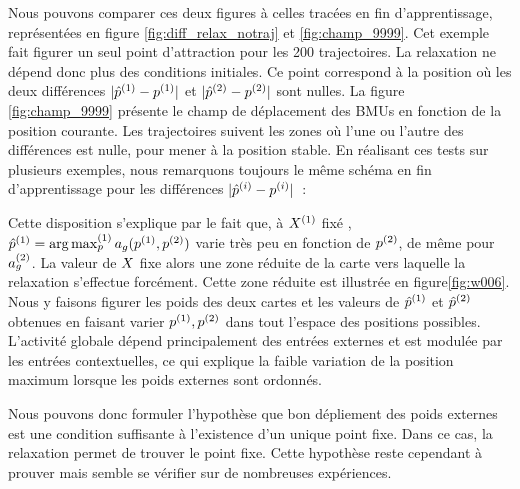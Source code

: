 \documentclass[../main]{subfiles}
\begin{document}
Nous pouvons comparer ces deux figures à celles tracées en fin d'apprentissage, représentées en figure \ref{fig:diff_relax_notraj} et \ref{fig:champ_9999}.
Cet exemple fait figurer un seul point d'attraction pour les 200 trajectoires. La relaxation ne dépend donc plus des conditions initiales.
Ce point correspond à la position où les deux différences $\lvert \hat{p}^{({1})} - p^{({1})} \rvert$ et $\lvert \hat{p}^{({2})} - p^{({2})}\rvert$ sont nulles.
La figure \ref{fig:champ_9999} présente le champ de déplacement des BMUs en fonction de la position courante. Les trajectoires suivent les zones où l'une ou l'autre des différences est nulle, pour mener à la position stable. 
En réalisant ces tests sur plusieurs exemples, nous remarquons toujours le même schéma en fin d'apprentissage pour les différences $\lvert \hat{p}^{({i})} - p^{({i})} \rvert$~:

Cette disposition s'explique par le fait que, à $X^{({1})}$ fixé ,$\hat{p}^{({1})} = \operatorname*{arg\,max}_p^{({1})} a_g(p^{({1})}, p^{({2})})$ varie très peu en fonction de $p^{({2})}$, de même pour $a_g^{({2})}$.
La valeur de $X$ fixe alors une zone réduite de la carte vers laquelle la relaxation s'effectue forcément.
Cette zone réduite est illustrée en figure\ref{fig:w006}. Nous y faisons figurer les poids des deux cartes et les valeurs de $\hat{p}^{({1})}$ et $\hat{p}^{({2})}$ obtenues en faisant varier $p^{({1})}, p^{({2})}$ dans tout l'espace des positions possibles. L'activité globale dépend principalement des entrées externes et est modulée par les entrées contextuelles, ce qui explique la faible variation de la position maximum lorsque les poids externes sont ordonnés.

Nous pouvons donc formuler l'hypothèse que bon dépliement des poids externes est une condition suffisante à l'existence d'un unique point fixe. 
Dans ce cas, la relaxation permet de trouver le point fixe.
Cette hypothèse reste cependant à prouver mais semble se vérifier sur de nombreuses expériences.
\end{document}

